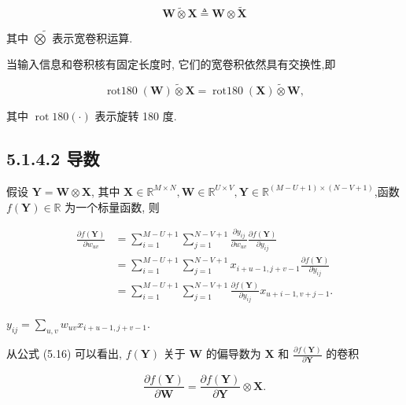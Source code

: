 \documentclass[10pt]{article}
\begin{document}
\begin{equation*}
\boldsymbol{W} \tilde{\otimes} \boldsymbol{X} \triangleq \boldsymbol{W} \otimes \tilde{\boldsymbol{X}} \tag{5.12}
\end{equation*}


其中 $\tilde{\bigotimes}$ 表示宽卷积运算.

当输入信息和卷积核有固定长度时, 它们的宽卷积依然具有交换性,即


\begin{equation*}
\operatorname{rot180}(\boldsymbol{W}) \tilde{\otimes} \boldsymbol{X}=\operatorname{rot180}(\boldsymbol{X}) \tilde{\otimes} \boldsymbol{W}, \tag{5.13}
\end{equation*}


其中 $\operatorname{rot} 180(\cdot)$ 表示旋转 180 度.

\subsection*{5.1.4.2 导数}
假设 $\boldsymbol{Y}=\boldsymbol{W} \otimes \boldsymbol{X}$, 其中 $\boldsymbol{X} \in \mathbb{R}^{M \times N}, \boldsymbol{W} \in \mathbb{R}^{U \times V}, \boldsymbol{Y} \in \mathbb{R}^{(M-U+1) \times(N-V+1)}$,函数 $f(\boldsymbol{Y}) \in \mathbb{R}$ 为一个标量函数, 则


\begin{align*}
\frac{\partial f(\boldsymbol{Y})}{\partial w_{u v}} & =\sum_{i=1}^{M-U+1} \sum_{j=1}^{N-V+1} \frac{\partial y_{i j}}{\partial w_{u v}} \frac{\partial f(\boldsymbol{Y})}{\partial y_{i j}}  \tag{5.14}\\
& =\sum_{i=1}^{M-U+1} \sum_{j=1}^{N-V+1} x_{i+u-1, j+v-1} \frac{\partial f(\boldsymbol{Y})}{\partial y_{i j}}  \tag{5.15}\\
& =\sum_{i=1}^{M-U+1} \sum_{j=1}^{N-V+1} \frac{\partial f(\boldsymbol{Y})}{\partial y_{i j}} x_{u+i-1, v+j-1} . \tag{5.16}
\end{align*}


$y_{i j}=\sum_{u, v} w_{u v} x_{i+u-1, j+v-1}$.

从公式 (5.16) 可以看出, $f(\boldsymbol{Y})$ 关于 $\boldsymbol{W}$ 的偏导数为 $\boldsymbol{X}$ 和 $\frac{\partial f(\boldsymbol{Y})}{\partial \boldsymbol{Y}}$ 的卷积


\begin{equation*}
\frac{\partial f(\boldsymbol{Y})}{\partial \boldsymbol{W}}=\frac{\partial f(\boldsymbol{Y})}{\partial \boldsymbol{Y}} \otimes \boldsymbol{X} . \tag{5.17}
\end{equation*}
\end{document}
